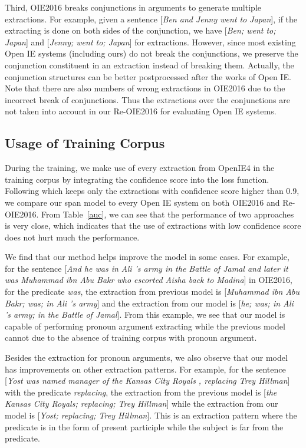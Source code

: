 \documentclass[letterpaper]{article} %
\begin{document}
Third, OIE2016 breaks conjunctions in arguments to generate multiple extractions. For example, given a sentence [\emph{Ben and Jenny went to Japan}], if the extracting is done on both sides of the conjunction, we have [\emph{Ben; went to; Japan}] and [\emph{Jenny; went to; Japan}] for extractions. However, since most existing Open IE systems (including ours) do not break the conjunctions, we preserve the conjunction constituent in an extraction instead of breaking them. Actually, the conjunction structures can be better postprocessed after the works of Open IE. Note that there are also numbers of wrong extractions in OIE2016 due to the incorrect break of conjunctions. Thus the extractions over the conjunctions are not taken into account in our Re-OIE2016 for evaluating Open IE systems.     



\subsection{Usage of Training Corpus}
During the training, we make use of every extraction from OpenIE4 in the training corpus by integrating the confidence score into the loss function. Following \cite{Cui2018NeuralOI} which keeps only the extractions with confidence score higher than 0.9, we compare our span model to every Open IE system on both OIE2016 and Re-OIE2016. From Table~\ref{auc}, we can see that the performance of two approaches is very close, which indicates that the use of extractions with low confidence score does not hurt much the performance. 

We find that our method helps improve the model in some cases. For example, for the sentence [\emph{And he was in Ali 's army in the Battle of Jamal and later it was Muhammad ibn Abu Bakr who escorted Aisha back to Madina}] in OIE2016, for the predicate \emph{was}, the extraction from previous model is [\emph{Muhammad ibn Abu Bakr; was; in Ali 's army}] and the extraction from  our model is [\emph{he; was; in Ali 's army; in the Battle of Jamal}]. From this example, we see that our model is capable of performing pronoun argument extracting while the previous model cannot due to the absence of training corpus with pronoun argument.

Besides the extraction for pronoun arguments, we also observe that our model has improvements on other extraction patterns. For example, for the sentence [\emph{Yost was named manager of the Kansas City Royals , replacing Trey Hillman}] with the predicate \emph{replacing}, the extraction from the previous model is [\emph{the Kansas City Royals; replacing; Trey Hillman}] while the extraction from our model is [\emph{Yost; replacing; Trey Hillman}]. This is an extraction pattern where the predicate is in the form of present participle while the subject is far from the predicate. 
\end{document}
